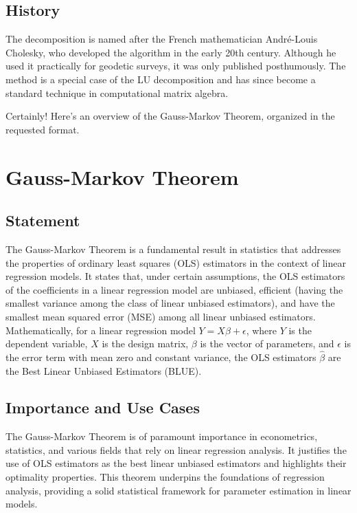 \documentclass{article}
\begin{document}
\subsection{History}
The decomposition is named after the French mathematician André-Louis Cholesky, who developed the algorithm in the early 20th century. Although he used it practically for geodetic surveys, it was only published posthumously. The method is a special case of the LU decomposition and has since become a standard technique in computational matrix algebra.

Certainly! Here's an overview of the Gauss-Markov Theorem, organized in the requested format.

\section{Gauss-Markov Theorem}

\subsection{Statement}
The Gauss-Markov Theorem is a fundamental result in statistics that addresses the properties of ordinary least squares (OLS) estimators in the context of linear regression models. It states that, under certain assumptions, the OLS estimators of the coefficients in a linear regression model are unbiased, efficient (having the smallest variance among the class of linear unbiased estimators), and have the smallest mean squared error (MSE) among all linear unbiased estimators. Mathematically, for a linear regression model \(Y = X\beta + \epsilon\), where \(Y\) is the dependent variable, \(X\) is the design matrix, \(\beta\) is the vector of parameters, and \(\epsilon\) is the error term with mean zero and constant variance, the OLS estimators \(\hat{\beta}\) are the Best Linear Unbiased Estimators (BLUE).

\subsection{Importance and Use Cases}
The Gauss-Markov Theorem is of paramount importance in econometrics, statistics, and various fields that rely on linear regression analysis. It justifies the use of OLS estimators as the best linear unbiased estimators and highlights their optimality properties. This theorem underpins the foundations of regression analysis, providing a solid statistical framework for parameter estimation in linear models.
\end{document}
